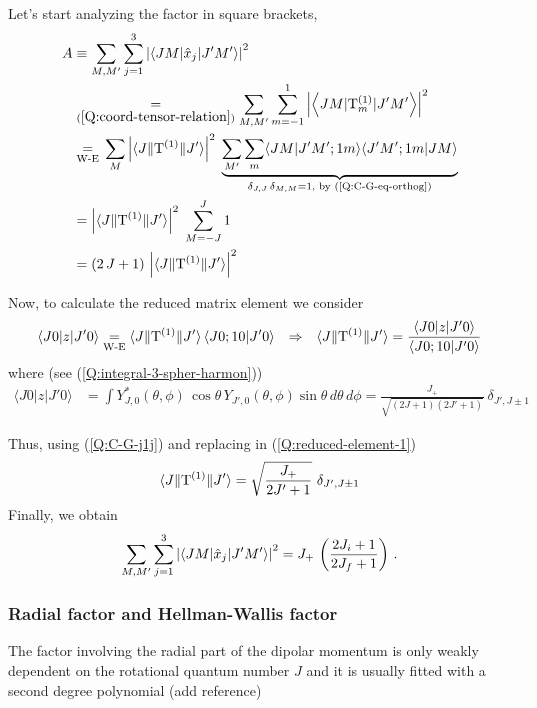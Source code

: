 Let's start analyzing the factor in square brackets, 
\begin{subequations}
  \begin{align}
    A &\equiv \sum_{M, M'} \sum_{j=1}^{3} \left| \left\langle J M | \hat{x}_{j} | J' M' \right\rangle \right|^{2} \\
    &\mathrel{\mathop{\kern0pt=}\limits_{(\ref{Q:coord-tensor-relation})}} \sum_{M, M'} \sum_{m=-1}^{1} \left| \left\langle J M | \mathrm{T}^{(1)}_{m} | J' M' \right\rangle \right|^{2}  \\
    & \mathrel{\mathop{\kern0pt=}\limits_{\text{W-E}}} \, \sum_{M}  \left|\langle J \| \mathrm{T}^{(1)} \| J' \rangle\right|^{2} \; \underbrace{\sum_{M'} \sum_{m}  \langle J M | J' M'; 1 m \rangle \langle J' M'; 1 m | J M \rangle}_{\delta_{J,J}\,\delta_{M,M} = 1 \text{,~by (\ref{Q:C-G-eq-orthog})}} \\ 
    &= \left|\langle J \| \mathrm{T}^{(1)} \| J' \rangle\right|^{2} \; \sum_{M=-J}^{J} 1 \\
    &=(2\, J +1) \, \left|\langle J  \| \mathrm{T}^{(1)} \| J' \rangle\right|^{2}
  \end{align}
\end{subequations}

Now, to calculate the reduced matrix element we consider 
\begin{align} 
   \langle J 0 | z | J' 0 \rangle \mathrel{\mathop{\kern0pt=}\limits_{\text{W-E}}} \langle J \| \mathrm{T}^{(1)} \| J' \rangle \, \langle J 0 ; 1 0 | J' 0 \rangle && \Rightarrow   && \langle J \| \mathrm{T}^{(1)} \| J' \rangle = \frac{ \langle J 0 | z | J' 0 \rangle }{ \langle J 0 ; 1 0 | J' 0 \rangle} \label{Q:reduced-element-1}
\end{align}
%
where (see (\ref{Q:integral-3-spher-harmon}))
%
\begin{align}
 \langle J 0 |z | J' 0 \rangle &= \int Y^{*}_{J,0}(\theta,\phi)\, \cos{\theta}\,Y_{J',0}(\theta,\phi) \sin{\theta}\, d \theta \, d \phi
=\frac{J_{+}}{\sqrt{(2J+1)(2J'+1)}}\ \delta_{J',J\pm 1} 
\end{align}

Thus, using (\ref{Q:C-G-j1j}) and replacing in (\ref{Q:reduced-element-1})
\begin{equation}
  \label{Q:W-E-reduced-element-j1}
  \langle J \| \T \| J' \rangle = \sqrt{\frac{J_{+}}{2J'+1}}\ \delta_{J',J\pm 1} 
\end{equation}
Finally, we obtain
\begin{equation} \label{Q:absorption-J}
 \sum_{M, M'} \sum_{j=1}^{3} \left| \left\langle J M | \hat{x}_{j} | J' M' \right\rangle \right|^{2} =  J_{+}\, \left( \frac{2J_{i}+1}{2J_{f}+1} \right)  \,.
\end{equation}

\subsubsection{Radial factor and Hellman-Wallis factor}
\label{S:radial-factor}
The factor involving the radial part of the dipolar momentum is only weakly dependent on the rotational quantum number $J$ and it is usually fitted with a second degree polynomial (add reference)

